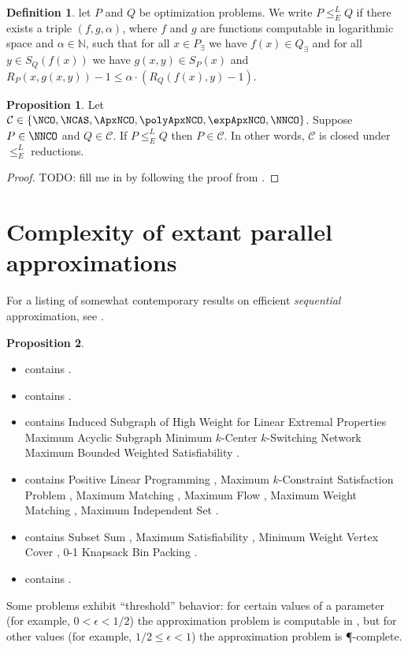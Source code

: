 \documentclass[draft]{article}
\theoremstyle{definition}
\newtheorem{definition}{Definition}
\newtheorem{proposition}{Proposition}
\newcommand{\Er}{\leq_E^{L}}
\newcommand{\apxncoproblems}{%
  Induced Subgraph of High Weight for Linear Extremal Properties \cite{dsst97}
  Maximum Acyclic Subgraph \cite[Section~7.4]{dsst97}
  Minimum $k$-Center \cite[Section~7.4]{dsst97}
  $k$-Switching Network \cite[Section~7.4]{dsst97}
  Maximum Bounded Weighted Satisfiability \cite[Theorem~4]{sx95}
}
\newcommand{\expapxncoproblems}{}
\newcommand{\fncasproblems}{%
  Subset Sum \cite[Theorem~4.1.4]{dsst97},
  Maximum Satisfiability \cite[Theorem~8]{trevisan98},
  Minimum Weight Vertex Cover \cite[Theorem~5.3.6]{dsst97},
  0-1 Knapsack \cite[Theorem~2]{mayr88}
  Bin Packing \cite[Theorem~3]{mayr88}
}
\newcommand{\ncasproblems}{%
  Positive Linear Programming \cite[Theorem~5.1.11]{dsst97},
  Maximum $k$-Constraint Satisfaction Problem \cite[Corollary~13]{trevisan98},
  Maximum Matching \cite[Theorem~5.2.1]{dsst97},
  Maximum Flow \cite[Theorem~5.2.2]{dsst97},
  Maximum Weight Matching \cite[Theorem~5.2.2]{dsst97},
  Maximum Independent Set \cite[Theorem 6.4.1]{dsst97}
}
\newcommand{\ncoproblems}{}
\newcommand{\polyapxncoproblems}{}
\begin{document}
\begin{definition}
  let $P$ and $Q$ be optimization problems.
  We write $P\Er Q$ if there exists a triple $(f, g, \alpha)$, where $f$ and $g$ are functions computable in logarithmic space and $\alpha\in\mathbb{N}$, such that for all $x\in P_\exists$ we have $f(x)\in Q_\exists$ and for all $y\in S_Q(f(x))$ we have $g(x, y)\in S_P(x)$ and $R_P(x, g(x, y)) - 1 \leq \alpha \cdot (R_Q(f(x), y) - 1)$.
\end{definition}

\begin{proposition}
  Let $\mathcal{C}\in \{\NCO, \NCAS, \ApxNCO, \polyApxNCO, \expApxNCO, \NNCO\}$.
  Suppose $P\in\NNCO$ and $Q\in\mathcal{C}$.
  If $P\Er Q$ then $P\in \mathcal{C}$.
  In other words, $\mathcal{C}$ is closed under $\Er$ reductions.
\end{proposition}
\begin{proof}
  TODO: fill me in by following the proof from \cite{tantau07}.
\end{proof}

\section{Complexity of extant parallel approximations}

For a listing of somewhat contemporary results on efficient \emph{sequential} approximation, see \cite{compendium}.

\begin{proposition}
  \mbox{}
  \begin{itemize}
  \item \expApxNCO{} contains \expapxncoproblems.
  \item \polyApxNCO{} contains \polyapxncoproblems.
  \item \ApxNCO{} contains \apxncoproblems.
  \item \NCAS{} contains \ncasproblems.
  \item \FNCAS{} contains \fncasproblems.
  \item \NCO{} contains \ncoproblems.
  \end{itemize}
\end{proposition}

Some problems exhibit ``threshold'' behavior: for certain values of a parameter (for example, $0 < \epsilon < 1/2$) the approximation problem is computable in \NC, but for other values (for example, $1/2 \leq \epsilon < 1$) the approximation problem is \P-complete.
\end{document}

